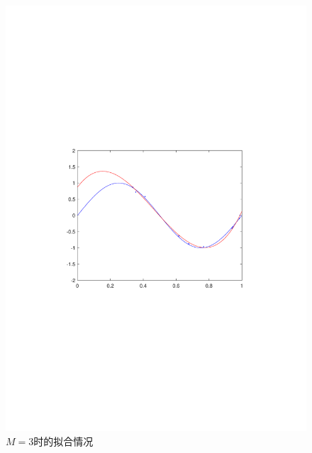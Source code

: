 \documentclass{article}
\begin{document}
\begin{homeworkProblem}
\begin{figure}[htbp]
		\begin{minipage}{0.49\linewidth}
			\centering
			\includegraphics[width=0.9\linewidth]{images/title/M=3.pdf}
			\caption{$M=3$时的拟合情况}
			\label{M=3}%
		\end{minipage}
		\begin{minipage}{0.49\linewidth}
			\centering

\end{minipage}
\end{figure}
\end{homeworkProblem}
\end{document}
